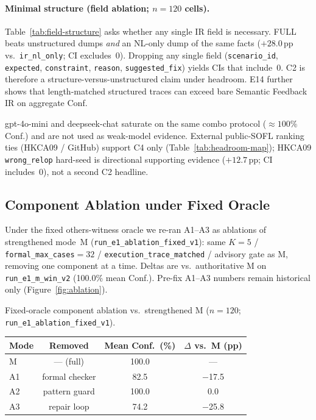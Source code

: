 

\paragraph{Minimal structure (field ablation; $n{=}120$ cells).}
Table~\ref{tab:field-structure} asks whether any single IR field is necessary.
FULL beats unstructured dumps \emph{and} an NL-only dump of the same facts
(${+}28.0$\,pp vs.\ \texttt{ir\_nl\_only}; CI excludes~0).
Dropping any single field (\texttt{scenario\_id}, \texttt{expected},
\texttt{constraint}, \texttt{reason}, \texttt{suggested\_fix}) yields CIs
that include~0.
C2 is therefore a structure-versus-unstructured claim under headroom.
E14 further shows that length-matched structured traces can exceed bare
Semantic Feedback IR on aggregate Conf.



gpt-4o-mini and deepseek-chat saturate on the same combo protocol
(${\approx}100\%$ Conf.) and are not used as weak-model evidence.
External public-SOFL ranking ties (HKCA09 / GitHub) support C4 only
(Table~\ref{tab:headroom-map}); HKCA09 \texttt{wrong\_relop} hard-seed is
directional supporting evidence (${+}12.7$\,pp; CI includes~0), not a second
C2 headline.

\subsection{Component Ablation under Fixed Oracle}
\label{sec:results:ablation-fixed}

Under the fixed others-witness oracle we re-ran A1--A3 as ablations of
strengthened mode~M (\texttt{run\_e1\_ablation\_fixed\_v1}): same $K{=}5$ /
\texttt{formal\_max\_cases}${}{=}32$ / \texttt{execution\_trace\_matched} /
advisory gate as M, removing one component at a time.
Deltas are vs.\ authoritative M on \texttt{run\_e1\_m\_win\_v2}
(100.0\% mean Conf.).
Pre-fix A1--A3 numbers remain historical only (Figure~\ref{fig:ablation}).

\begin{inlinetable}{Fixed-oracle component ablation vs.\ strengthened M
  ($n{=}120$; \texttt{run\_e1\_ablation\_fixed\_v1}).}
  \label{tab:ablation-fixed}
  \begin{tabular}{lccc}
    \toprule
    Mode & Removed & Mean Conf.\ (\%) & $\Delta$ vs.\ M (pp) \\
    \midrule
    M  & --- (full) & 100.0 & --- \\
    A1 & formal checker & 82.5 & $-$17.5 \\
    A2 & pattern guard & 100.0 & $0.0$ \\
    A3 & repair loop & 74.2 & $-$25.8 \\
    \bottomrule
  \end{tabular}
\end{inlinetable}

